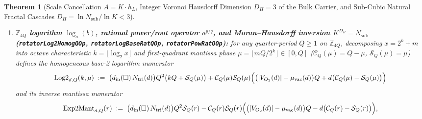 \documentclass[11pt,a4paper]{article}
\theoremstyle{plain}
\newtheorem{theorem}{Theorem}[section]
\theoremstyle{definition}
\begin{document}
\begin{theorem}[Scale Cancellation $A = K\cdot h_L$, Integer Voronoi Hausdorff Dimension $D_H = 3$ of the Bulk Carrier, and Sub-Cubic Natural Fractal Cascades $D_H = \ln N_{\mathrm{sub}}/\ln K < 3$]
\begin{enumerate}[label=\textbf{(\arabic*)},leftmargin=*]
  \begin{itemize}[leftmargin=*]
  \item \emph{Channel-2 / 3-SAT Sierpi\'nski--Post octant sponge ($K = 2$):} $N_{\mathrm{sub}} = 2^3 - 1 = 7 < 8 = 2^3$, yielding $D_H = \ln 7/\ln 2 \approx 2.807355$;
  \item \emph{Cuboctahedral causal cluster $\mathcal{C}_{13}$ inside the $3\times 3\times 3$ Moore cube ($K = d = 3$):} single-tick causality retains $N_{\mathrm{sub}} = N_\varphi(3) = 13 < 27 = 3^3$ nodes, yielding $D_H = \ln 13/\ln 3 \approx 2.334718$;
  \item \emph{Hierarchical clustering of bound matter on the fine-structure ladder ($K = \lfloor\alpha_{\mathrm{fs}}^{-1}\rfloor = 137$):} coherent shell closures $N_{\mathrm{sub}}\in\{13, 42, 147\} \ll 137^3$ occupy a porous fractal subset ($D_H = \ln N_{\mathrm{sub}}/\ln 137 \in [0.522, 0.999] < 3$);
  \item \emph{Biological vascular and bronchial branching networks (\texttt{allometryExponentRatioOp}):} $4$-fold cuboctahedral square-face branching $k = d_{\mathrm{in}}(\square) = 4$ in $3$ spatial dimensions yields Kleiber's $3/4$ metabolic fractal scaling exponent $(d_{\mathrm{in}}(\square)-\mu_{\mathrm{vac}})/d_{\mathrm{in}}(\square) = 3/4$.
  \end{itemize}
\item \textbf{$\mathbb{Z}_{4Q}$ logarithm $\log_a(b)$, rational power/root operator $a^{p/q}$, and Moran--Hausdorff inversion $K^{D_H} = N_{\mathrm{sub}}$ (\texttt{rotatorLog2HomogQOp}, \texttt{rotatorLogBaseRatQOp}, \texttt{rotatorPowRatQOp}):}
  for any quarter-period $Q\ge 1$ on $\mathbb{Z}_{4Q}$, decomposing $x = 2^k + m$ into octave characteristic $k = \lfloor\log_2 x\rfloor$ and first-quadrant mantissa phase $\mu = \lfloor m Q/2^k\rfloor\in[0,Q]$ ($\mathcal{C}_Q(\mu)=Q-\mu$, $\mathcal{S}_Q(\mu)=\mu$) defines the homogeneous base-2 logarithm numerator
  \begin{equation}
    \label{eq:log2-homog-q}
    \operatorname{Log2}_{d,Q}(k,\mu) \;:=\; \bigl(d_{\mathrm{in}}(\square)\,N_{\mathrm{tri}}(d)\bigr)Q^2\bigl(k Q + \mathcal{S}_Q(\mu)\bigr) + \mathcal{C}_Q(\mu)\mathcal{S}_Q(\mu)\Bigl(\bigl(|V_{O_2}(d)|-\mu_{\mathrm{vac}}(d)\bigr)Q + d\bigl(\mathcal{C}_Q(\mu)-\mathcal{S}_Q(\mu)\bigr)\Bigr)
  \end{equation}
  and its inverse mantissa numerator
  \begin{equation}
    \label{eq:exp2-homog-q}
    \operatorname{Exp2Mant}_{d,Q}(r) \;:=\; \bigl(d_{\mathrm{in}}(\square)\,N_{\mathrm{tri}}(d)\bigr)Q^2\mathcal{S}_Q(r) - \mathcal{C}_Q(r)\mathcal{S}_Q(r)\Bigl(\bigl(|V_{O_2}(d)|-\mu_{\mathrm{vac}}(d)\bigr)Q - d\bigl(\mathcal{C}_Q(r)-\mathcal{S}_Q(r)\bigr)\Bigr),

\end{equation}
\end{enumerate}
\end{theorem}
\end{document}
